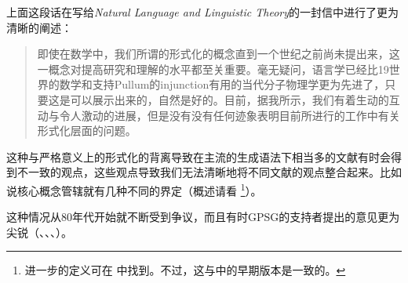 上面这段话在写给\emph{Natural Language and Linguistic Theory}的一封信中进行了更为清晰的阐述：
\begin{quote}
即使在数学中，我们所谓的形式化的概念直到一个世纪之前尚未提出来，这一概念对提高研究和理解的水平都至关重要。毫无疑问，语言学已经比19世界的数学和支持Pullum的injunction有用的当代分子物理学更为先进了，只要这是可以展示出来的，自然是好的。目前，据我所示，我们有着生动的互动与令人激动的进展，但是没有没有任何迹象表明目前所进行的工作中有关形式化层面的问题。 \citep[]{Chomsky90a}
\end{quote}
这种与严格意义上的形式化的背离导致在主流的生成语法下相当多的文献有时会得到不一致的观点，这些观点导致我们无法清晰地将不同文献的观点整合起来。比如说核心概念管辖就有几种不同的界定（概述请看\citealp{AS83a} \footnote{%
进一步的定义可在 中找到。不过，这与\citet[--106]{PP86a}中的早期版本是一致的。%
}）。

这种情况从80年代开始就不断受到争议，而且有时GPSG的支持者提出的意见更为尖锐（\citealp*[]{GKPS85a}、\citealp{Pullum85a,Pullum89b}、\citealp[]{Pullum91b}、\citealp{KP90a}）。

